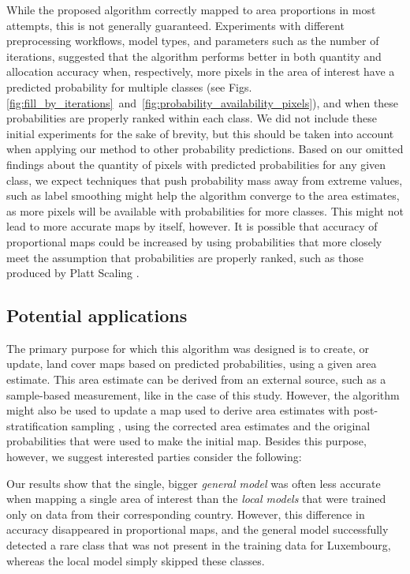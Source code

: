         While the proposed algorithm correctly mapped to area proportions in most attempts, this is not generally guaranteed. Experiments with different preprocessing workflows, model types, and parameters such as the number of iterations, suggested that the algorithm performs better in both quantity and allocation accuracy when, respectively, more pixels in the area of interest have a predicted probability for multiple classes (see Figs.\ref{fig:fill_by_iterations}~and~\ref{fig:probability_availability_pixels}), and when these probabilities are properly ranked within each class. We did not include these initial experiments for the sake of brevity, but this should be taken into account when applying our method to other probability predictions. Based on our omitted findings about the quantity of pixels with predicted probabilities for any given class, we expect techniques that push probability mass away from extreme values, such as label smoothing \citep{müller2020when} might help the algorithm converge to the area estimates, as more pixels will be available with probabilities for more classes. This might not lead to more accurate maps by itself, however. It is possible that accuracy of proportional maps could be increased by using probabilities that more closely meet the assumption that probabilities are properly ranked, such as those produced by Platt Scaling \citep{niculescu2005predicting}.

    \subsection{Potential applications}

        The primary purpose for which this algorithm was designed is to create, or update, land cover maps based on predicted probabilities, using a given area estimate. This area estimate can be derived from an external source, such as a sample-based measurement, like in the case of this study. However, the algorithm might also be used to update a map used to derive area estimates with post-stratification sampling \citep{olofsson2014good}, using the corrected area estimates and the original probabilities that were used to make the initial map. Besides this purpose, however, we suggest interested parties consider the following:

        Our results show that the single, bigger \textit{general model} was often less accurate when mapping a single area of interest than the \textit{local models} that were trained only on data from their corresponding country. However, this difference in accuracy disappeared in proportional maps, and the general model successfully detected a rare class that was not present in the training data for Luxembourg, whereas the local model simply skipped these classes.

